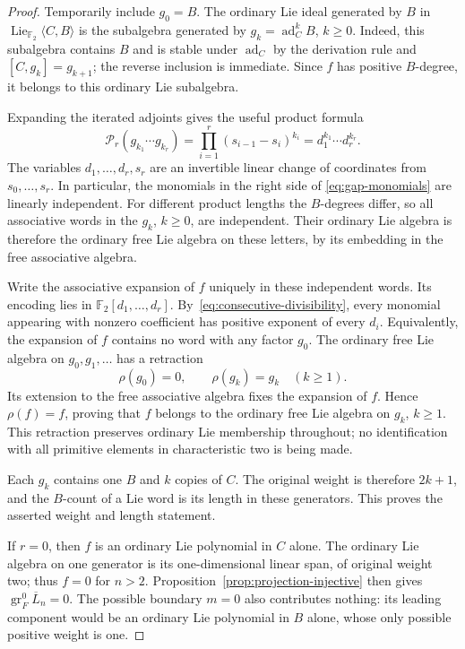 \documentclass[11pt]{article}
\theoremstyle{definition}
\theoremstyle{remark}
\numberwithin{equation}{section}
\begin{document}
\begin{proof}
Temporarily include $g_0=B$.
The ordinary Lie ideal generated by $B$ in
$\operatorname{Lie}_{{\mathbb F_2}}\langle C,B\rangle$ is the subalgebra generated by
$g_k=\operatorname{ad}_C^kB$, $k\geq0$.
Indeed, this subalgebra contains $B$ and is stable under $\operatorname{ad}_C$
by the derivation rule and $[C,g_k]=g_{k+1}$; the reverse inclusion
is immediate.  Since $f$ has positive $B$-degree, it belongs to
this ordinary Lie subalgebra.

Expanding the iterated adjoints gives the useful product formula
\begin{equation}
 \label{eq:gap-monomials}
 \mathcal P_r(g_{k_1}\cdots g_{k_r})
 =\prod_{i=1}^r(s_{i-1}-s_i)^{k_i}
 =d_1^{k_1}\cdots d_r^{k_r}.
\end{equation}
The variables $d_1,\ldots,d_r,s_r$ are an invertible linear
change of coordinates from $s_0,\ldots,s_r$.
In particular, the monomials in the right side of
\eqref{eq:gap-monomials} are linearly independent.
For different product lengths the $B$-degrees differ, so all
associative words in the $g_k$, $k\geq0$, are independent.
Their ordinary Lie algebra is therefore the ordinary free Lie
algebra on these letters, by its embedding in the free associative
algebra.

Write the associative expansion of $f$ uniquely in these independent
words.  Its encoding lies in ${\mathbb F_2}[d_1,\ldots,d_r]$.
By~\eqref{eq:consecutive-divisibility}, every monomial appearing
with nonzero coefficient has positive exponent of every $d_i$.
Equivalently, the expansion of $f$ contains no word with any factor
$g_0$.  The ordinary free Lie algebra on $g_0,g_1,\ldots$ has a
retraction
\[
 \rho(g_0)=0,\qquad \rho(g_k)=g_k\quad(k\geq1).
\]
Its extension to the free associative algebra fixes the expansion
of $f$.  Hence $\rho(f)=f$, proving that $f$ belongs to the
ordinary free Lie algebra on $g_k$, $k\geq1$.
This retraction preserves ordinary Lie membership throughout;
no identification with all primitive elements in characteristic
two is being made.

Each $g_k$ contains one $B$ and $k$ copies of $C$.
The original weight is therefore $2k+1$, and the $B$-count of a
Lie word is its length in these generators.  This proves the
asserted weight and length statement.

If $r=0$, then $f$ is an ordinary Lie polynomial in $C$ alone.
The ordinary Lie algebra on one generator is its one-dimensional
linear span, of original weight two; thus $f=0$ for $n>2$.
Proposition~\ref{prop:projection-injective} then gives
$\operatorname{gr}^0_F\overline L_n=0$.
The possible boundary $m=0$ also contributes nothing: its leading
component would be an ordinary Lie polynomial in $B$ alone,
whose only possible positive weight is one.
\end{proof}
\end{document}
